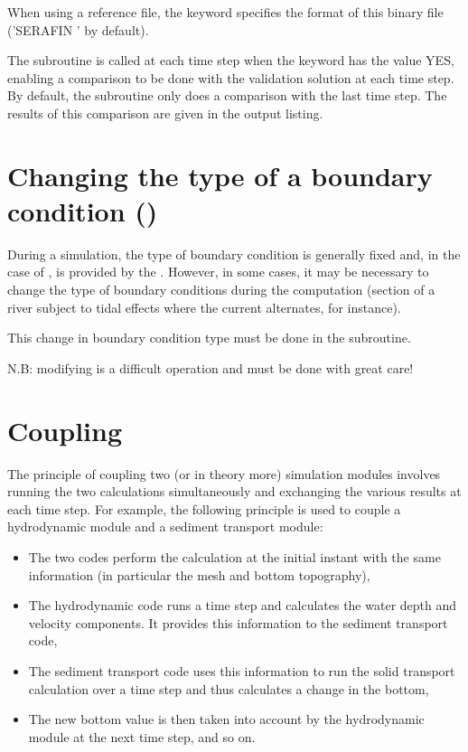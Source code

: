 When using a reference file, the keyword 
specifies the format of this binary file ('SERAFIN ' by default).

The  subroutine is called at each time step
when the keyword  has the value YES,
enabling a comparison to be done with the validation solution at each time step.
By default, the  subroutine only does a comparison
with the last time step.
The results of this comparison are given in the output listing.


\section{Changing the type of a boundary condition ()}
\label{sec:chang:type:bc:propin}
During a simulation, the type of boundary condition is generally fixed and, in
the case of , is provided by the .
However, in some cases, it may be necessary to change the type of boundary
conditions during the computation (section of a river subject to tidal effects
where the current alternates, for instance).

This change in boundary condition type must be done in the
 subroutine.

N.B: modifying  is a difficult operation
and must be done with great care!


\section{Coupling}
\label{sec:coupling}

The principle of coupling two (or in theory more) simulation modules involves
running the two calculations simultaneously and exchanging the various results
at each time step.
For example, the following principle is used to couple a hydrodynamic module
and a sediment transport module:

\begin{itemize}
\item The two codes perform the calculation at the initial instant
with the same information (in particular the mesh and bottom topography),

\item The hydrodynamic code runs a time step and calculates the water depth
and velocity components.
It provides this information to the sediment transport code,

\item The sediment transport code uses this information to run the solid
transport calculation over a time step and thus calculates a change in the
bottom,

\item The new bottom value is then taken into account by the hydrodynamic module
at the next time step, and so on.
\end{itemize}

